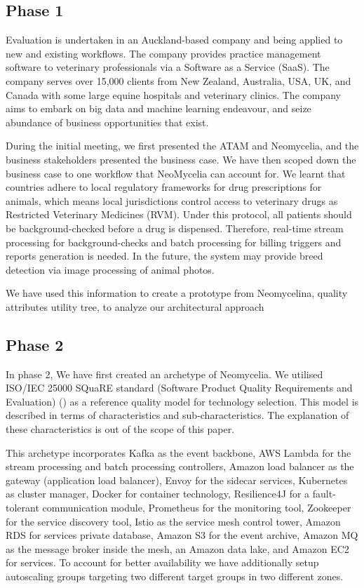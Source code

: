 \documentclass[conference]{IEEEtran}
\begin{document}
\subsection{Phase 1}



Evaluation is undertaken in an Auckland-based company and being applied to new and existing workflows. The company provides practice management software to veterinary professionals via a Software as a Service (SaaS). The company serves over 15,000 clients from New Zealand, Australia, USA, UK, and Canada with some large equine hospitals and veterinary clinics. The company aims to embark on big data and machine learning endeavour, and seize abundance of business opportunities that exist.

During the initial meeting, we first presented the ATAM and Neomycelia, and the business stakeholders presented the business case. We have then scoped down the business case to one workflow that NeoMycelia can account for. We learnt that countries adhere to local regulatory frameworks for drug prescriptions for animals, which means local jurisdictions control access to veterinary drugs as Restricted Veterinary Medicines (RVM). Under this protocol, all patients should be background-checked before a drug is dispensed. Therefore, real-time stream processing for background-checks and batch processing for billing triggers and reports generation is needed.  In the future, the system may provide breed detection via image processing of animal photos.

We have used this information to create a prototype from Neomycelina,  quality attributes utility tree, to analyze our architectural approach

\subsection{Phase 2}

In phase 2, We have first created an archetype of Neomycelia. We utilised ISO/IEC 25000 SQuaRE standard (Software Product Quality Requirements and Evaluation) (\cite{Iso}) as a reference quality model for technology selection. This model is described in terms of characteristics and sub-characteristics. The explanation of these characteristics is out of the scope of this paper. 

This archetype incorporates Kafka as the event backbone, AWS Lambda for the stream processing and batch processing controllers, Amazon load balancer as the gateway (application load balancer), Envoy for the sidecar services, Kubernetes as cluster manager, Docker for container technology, Resilience4J for a fault-tolerant communication module, Prometheus for the monitoring tool, Zookeeper for the service discovery tool, Istio as the service mesh control tower, Amazon RDS for services private database, Amazon S3 for the event archive, Amazon MQ as the message broker inside the mesh, an Amazon data lake, and Amazon EC2 for services. To account for better availability we have additionally setup autoscaling groups targeting two different target groups in two different zones.
\end{document}
